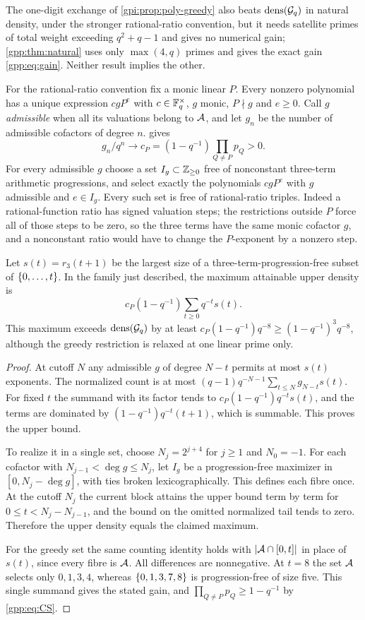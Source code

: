 The one-digit exchange of \cref{gpi:prop:poly-greedy} also beats $\operatorname{dens}(\mathcal{G}_q)$ in
natural density, under the stronger rational-ratio convention, but it needs satellite
primes of total weight exceeding $q^2+q-1$ and gives no numerical gain; \cref{gpp:thm:natural}
uses only $\max(4,q)$ primes and gives the exact gain \eqref{gpp:eq:gain}. Neither result
implies the other.

For the rational-ratio convention fix a monic linear $P$. Every nonzero polynomial has a
unique expression $cgP^e$ with $c\in\mathbb{F}_q^\times$, $g$ monic, $P\nmid g$ and $e\ge0$. Call
$g$ \emph{admissible} when all its valuations belong to $\mathcal{A}$, and let $g_n$ be the
number of admissible cofactors of degree $n$.  gives
\[
 g_n/q^n\longrightarrow c_P=(1-q^{-1})\prod_{Q\ne P}p_Q>0 .
\]
For every admissible $g$ choose a set $I_g\subset\mathbb{Z}_{\ge0}$ free of nonconstant
three-term arithmetic progressions, and select exactly the polynomials $cgP^e$ with $g$
admissible and $e\in I_g$. Every such set is free of rational-ratio triples. Indeed a
rational-function ratio has signed valuation steps; the restrictions outside $P$ force
all of those steps to be zero, so the three terms have the same monic cofactor $g$, and a
nonconstant ratio would have to change the $P$-exponent by a nonzero step.

\begin{theorem}\label{gpp:thm:rational}
Let $s(t)=r_3(t+1)$ be the largest size of a three-term-progression-free subset of
$\{0,\ldots,t\}$. In the family just described, the maximum attainable upper density is
\[
 c_P(1-q^{-1})\sum_{t\ge0}q^{-t}s(t).
\]
This maximum exceeds $\operatorname{dens}(\mathcal{G}_q)$ by at least
$c_P(1-q^{-1})q^{-8}\ge(1-q^{-1})^3q^{-8}$, although the greedy restriction is relaxed at
one linear prime only.
\end{theorem}

\begin{proof}
At cutoff $N$ any admissible $g$ of degree $N-t$ permits at most $s(t)$ exponents. The
normalized count is at most $(q-1)q^{-N-1}\sum_{t\le N}g_{N-t}s(t)$. For fixed $t$ the
summand with its factor tends to $c_P(1-q^{-1})q^{-t}s(t)$, and the terms are dominated
by $(1-q^{-1})q^{-t}(t+1)$, which is summable. This proves the upper bound.

To realize it in a single set, choose $N_j=2^{j+4}$ for $j\ge1$ and $N_0=-1$. For each
cofactor with $N_{j-1}<\deg g\le N_j$, let $I_g$ be a progression-free maximizer in
$[0,N_j-\deg g]$, with ties broken lexicographically. This defines each fibre once. At
the cutoff $N_j$ the current block attains the upper bound term by term for
$0\le t<N_j-N_{j-1}$, and the bound on the omitted normalized tail tends to zero.
Therefore the upper density equals the claimed maximum.

For the greedy set the same counting identity holds with $\lvert\mathcal{A}\cap[0,t]\rvert$ in place
of $s(t)$, since every fibre is $\mathcal{A}$. All differences are nonnegative. At $t=8$ the
set $\mathcal{A}$ selects only $0,1,3,4$, whereas $\{0,1,3,7,8\}$ is progression-free of size
five. This single summand gives the stated gain, and $\prod_{Q\ne P}p_Q\ge1-q^{-1}$ by
\eqref{gpp:eq:CS}.
\end{proof}


